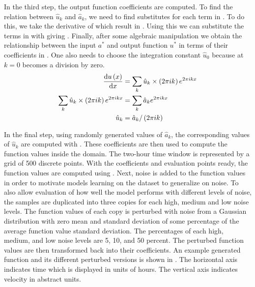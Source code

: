 In the third step, the output function coefficients are computed. To find the relation between \(\hat{u}_k \) and \(\hat{a}_k \), we need to find substitutes for each term in . To do this, we take the derivative of  which result in . Using this we can substitute the terms in  with  giving . Finally, after some algebraic manipulation we obtain the relationship between the input \(a^*\) and output function \(u^*\) in terms of their coefficients in . One also needs to choose the integration constant \(\hat{u}_{0}\) because at \(k=0\)  becomes a division by zero.
\begin{align}
  \dv{u\left( x \right)}{x}                                    & = \sum_{k} \hat{u}_k\times \left( 2\pi ik \right) e^{2\pi ikx} \label{eq:fourier_series_derivative} \\
  \sum_{k} \hat{u}_k\times \left( 2\pi ik \right) e^{2\pi ikx} & = \sum_{k} \hat{a}_k e^{2\pi ikx} \label{eq:example_spectral_method_fourier_substituted}            \\
  \hat{u}_k                                                    & = \hat{a}_k / \left( 2\pi ik \right) \label{eq:derivative_coeff}
\end{align}

In the final step, using randomly generated values of \(\hat{a}_k\), the corresponding values of \(\hat{u}_k\) are computed with . These coefficients are then used to compute the function values inside the domain. The two-hour time window is represented by a grid of 500 discrete points. With the coefficients and evaluation points ready, the function values are computed using . Next, noise is added to the function values in order to motivate models learning on the dataset to generalize on noise. To also allow evaluation of how well the model performs with different levels of noise, the samples are duplicated into three copies for each high, medium and low noise levels. The function values of each copy is perturbed with noise from a Gaussian distribution with zero mean and standard deviation of some percentage of the average function value standard deviation. The percentages of each high, medium, and low noise levels are 5, 10, and 50 percent. The perturbed function values are then transformed back into their coefficients. An example generated function and its different perturbed versions is shown in . The horizontal axis indicates time which is displayed in units of hours. The vertical axis indicates velocity in abstract units.

